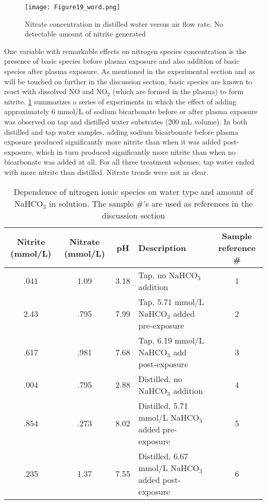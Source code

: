 \begin{figure}[htbp]
  \centering
  \texttt{[image: Figure19\_word.png]}
  \caption{Nitrate concentration in distilled water versus air flow rate. No detectable amount of nitrite generated}
  \label{fig:nitrogen_vs_flow}
\end{figure}

One variable with remarkable effects on nitrogen species concentration is the presence of basic species before plasma exposure and also addition of basic species after plasma exposure.  As mentioned in the experimental section and as will be touched on further in the discussion section, basic species are known to react with dissolved NO and NO$_2$ (which are formed in the plasma) to form nitrite. \cref{tab:bicarb} summarizes a series of experiments in which the effect of adding approximately 6 mmol/L of sodium bicarbonate before or after plasma exposure was observed on tap and distilled water substrates (200 mL volume).  In both distilled and tap water samples, adding sodium bicarbonate before plasma exposure produced significantly more nitrite than when it was added post-exposure, which in turn produced significantly more nitrite than when no bicarbonate was added at all.  For all three treatment schemes, tap water ended with more nitrite than distilled.  Nitrate trends were not as clear.

\begin{table}[htpb]
  \begin{center}
    \begin{tabularx}{\textwidth}{|c |c |c |X |c |}
      \hline
      \textbf{Nitrite (mmol/L)} & \textbf{Nitrate (mmol/L)} & \textbf{pH} & \textbf{Description} & \textbf{Sample reference \#} \\\hline
      .041 & 1.09 & 3.18 & Tap, no NaHCO$_3$ addition & 1 \\\hline
      2.43 & .795 & 7.99 & Tap, 5.71 mmol/L NaHCO$_3$ added pre-exposure & 2 \\\hline
      .617 & .981 & 7.68 & Tap, 6.19 mmol/L NaHCO$_3$ add post-exposure & 3 \\\hline
      .004 & .795 & 2.88 & Distilled, no NaHCO$_3$ addition & 4 \\\hline
      .854 & .273 & 8.02 & Distilled, 5.71 mmol/L NaHCO$_3$ added pre-exposure & 5 \\\hline
      .235 & 1.37 & 7.55 & Distilled, 6.67 mmol/L NaHCO$_3$ added post-exposure & 6 \\\hline
    \end{tabularx}
  \end{center}
  \caption{Dependence of nitrogen ionic species on water type and amount of NaHCO$_3$ in solution.  The sample \#'s are used as references in the discussion section}
  \label{tab:bicarb}
\end{table}

